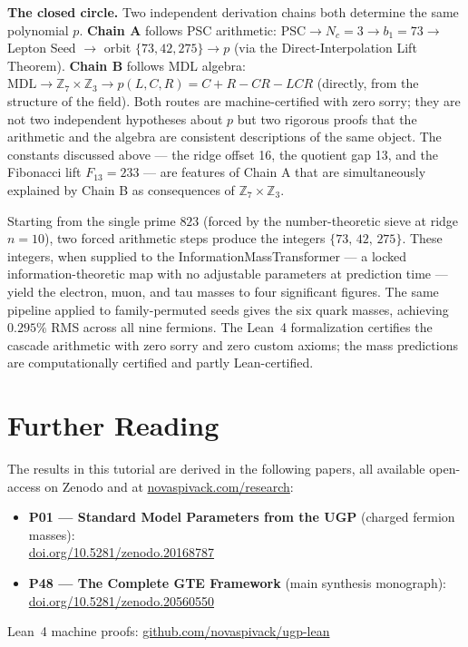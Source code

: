 \documentclass[11pt,a4paper]{article}
\newcommand{\Nc}{N_c}
\begin{document}
\medskip
\noindent\textbf{The closed circle.}\enspace
Two independent derivation chains both determine the same polynomial $p$.
\textbf{Chain A} follows PSC arithmetic: $\text{PSC} \to \Nc = 3 \to b_1 = 73 \to$
Lepton Seed $\to$ orbit $\{73, 42, 275\} \to p$ (via the Direct-Interpolation Lift
Theorem).
\textbf{Chain B} follows MDL algebra: $\text{MDL} \to \mathbb{Z}_7 \times \mathbb{Z}_3
\to p(L,C,R) = C + R - CR - LCR$ (directly, from the structure of the field).
Both routes are machine-certified with zero sorry; they are not two independent
hypotheses about $p$ but two rigorous proofs that the arithmetic and the algebra are
consistent descriptions of the same object.  The constants discussed above --- the
ridge offset 16, the quotient gap 13, and the Fibonacci lift $F_{13} = 233$ --- are
features of Chain A that are simultaneously explained by Chain B as consequences
of $\mathbb{Z}_7 \times \mathbb{Z}_3$.

\begin{tcolorbox}[colback=boxblue,colframe=blue!40!black,
  title=One-paragraph summary of the mass chain]
Starting from the single prime $823$ (forced by the number-theoretic sieve at
ridge $n=10$), two forced arithmetic steps produce the integers $\{73,\,42,\,275\}$.
These integers, when supplied to the InformationMassTransformer --- a locked
information-theoretic map with no adjustable parameters at prediction time --- yield
the electron, muon, and tau masses to four significant figures.  The same pipeline
applied to family-permuted seeds gives the six quark masses, achieving $0.295\%$
RMS across all nine fermions.  The Lean~4 formalization certifies the cascade
arithmetic with zero sorry and zero custom axioms; the mass predictions are
computationally certified and partly Lean-certified.
\end{tcolorbox}


\section*{Further Reading}
\begin{tcolorbox}[colback=orange!8,colframe=orange!50!black,
  title=\textbf{Primary Sources}]
The results in this tutorial are derived in the following papers,
all available open-access on Zenodo and at
\href{https://novaspivack.com/research}{novaspivack.com/research}:
\begin{itemize}
  \item \textbf{P01 --- Standard Model Parameters from the UGP} (charged fermion masses):\\
        \href{https://doi.org/10.5281/zenodo.20168787}{doi.org/10.5281/zenodo.20168787}
  \item \textbf{P48 --- The Complete GTE Framework} (main synthesis monograph):\\
        \href{https://doi.org/10.5281/zenodo.20560550}{doi.org/10.5281/zenodo.20560550}
\end{itemize}
Lean~4 machine proofs: \href{https://github.com/novaspivack/ugp-lean}{github.com/novaspivack/ugp-lean}
\end{tcolorbox}


\end{document}
